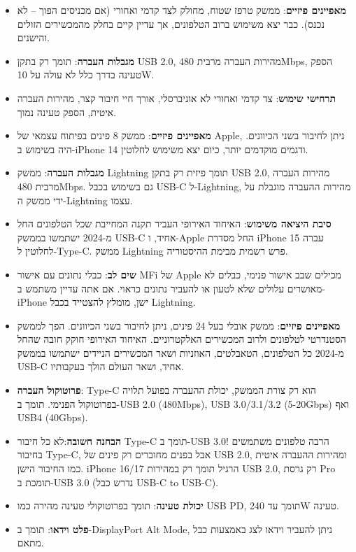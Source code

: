 
\begin{itemize}
  \item \textbf{מאפיינים פיזיים}: ממשק טרפז שטוח, מחולק לצד קדמי ואחורי (אם מכניסים הפוך – לא נכנס). כבר יצא משימוש ברוב הטלפונים, אך עדיין קיים בחלק מהמכשירים הזולים והישנים.
  \item \textbf{מגבלות העברה}: תומך רק בתקן USB 2.0, מהירות העברה מרבית 480Mbps, הספק טעינה בדרך כלל לא עולה על 10W.
  \item \textbf{תרחישי שימוש}: צד קדמי ואחורי לא אוניברסלי, אורך חיי חיבור קצר, מהירות העברה איטית, הספק טעינה נמוך.
\end{itemize}


\begin{itemize}
  \item \textbf{מאפיינים פיזיים}: ממשק 8 פינים בפיתוח עצמאי של Apple, ניתן לחיבור בשני הכיוונים. היה בשימוש ב-iPhone 14 ודגמים מוקדמים יותר, כיום יצא משימוש לחלוטין.
  \item \textbf{מגבלות העברה}: ממשק Lightning תומך פיזית רק בתקן USB 2.0, מהירות העברה מרבית 480Mbps. גם בשימוש בכבל USB-C ל-Lightning, מהירות ההעברה מוגבלת על ידי ממשק ה-Lightning עצמו.
  \item \textbf{סיבת היציאה משימוש}: האיחוד האירופי העביר תקנה המחייבת שכל הטלפונים החל מ-2024 ישתמשו בממשק USB-C אחיד, ו-Apple החל מסדרת iPhone 15 עברה לחלוטין ל-Type-C. ממשק Lightning פרש רשמית מבימת ההיסטוריה.
  \item \textbf{שים לב}: כבלי נתונים עם אישור MFi של Apple מכילים שבב אישור פנימי, כבלים לא מאושרים עלולים שלא לטעון או להעביר נתונים כראוי. אם אתה עדיין משתמש ב-iPhone ישן, מומלץ להצטייד בכבל Lightning.
\end{itemize}


\begin{itemize}
  \item \textbf{מאפיינים פיזיים}: ממשק אובלי בעל 24 פינים, ניתן לחיבור בשני הכיוונים. הפך לממשק הסטנדרטי לטלפונים ולרוב המכשירים האלקטרוניים. האיחוד האירופי חוקק חובה שהחל מ-2024 כל הטלפונים, הטאבלטים, האוזניות ושאר המכשירים הניידים ישתמשו בממשק USB-C אחיד, ושאר העולם הולך בעקבותיו.
  \item \textbf{פרוטוקול העברה}: Type-C הוא רק צורת הממשק, יכולת ההעברה בפועל תלויה בפרוטוקול הפנימי. תומך ב-USB 2.0 (480Mbps), USB 3.0/3.1/3.2 (5-20Gbps) ואף USB4 (40Gbps).
  \item \textbf{הבחנה חשובה}:לא כל חיבור Type-C תומך ב-USB 3.0! הרבה טלפונים משתמשים בחיבור Type-C, אבל בפנים מחוברים רק פינים של USB 2.0, ומהירות ההעברה איטית כמו החיבור הישן. iPhone 16/17 הרגיל תומך רק במהירות USB 2.0, רק גרסת Pro תומכת ב-USB 3.0 (נדרש כבל USB-C to USB-C).
  \item \textbf{יכולת טעינה}: תומך בפרוטוקולי טעינה מהירה כמו USB PD, תומך עד 240W טעינה.
  \item \textbf{פלט וידאו}: תומך ב-DisplayPort Alt Mode, ניתן להעביר וידאו לצג באמצעות כבל מתאם.
\end{itemize}


